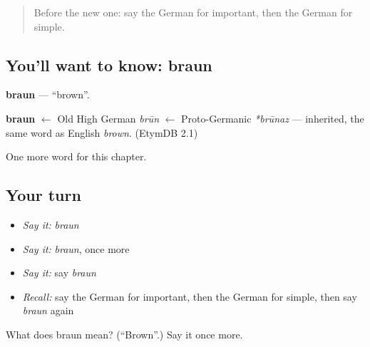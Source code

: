\begin{quote}
Before the new one: say the German for important, then the German for simple.
\end{quote}

\subsection*{You'll want to know: braun}
\textbf{braun} — \textquotedblleft{}brown\textquotedblright{}.

\begin{cousinweb}
\textbf{braun} $\leftarrow$ Old High German \emph{brūn} $\leftarrow$ Proto-Germanic \emph{*brūnaz} — inherited, the same word as English \emph{brown}. (EtymDB 2.1)
\end{cousinweb}

\begin{grammarlens}[title={What you've built}]
One more word for this chapter.
\end{grammarlens}

\subsection*{Your turn}
\begin{itemize}
\raggedright
  \item \emph{Say it:} \emph{braun}
  \item \emph{Say it:} \emph{braun}, once more
  \item \emph{Say it:} say \emph{braun}
  \item \emph{Recall:} say the German for important, then the German for simple, then say \emph{braun} again
\end{itemize}

\begin{tcolorbox}[breakable,colback=teal!4,colframe=teal!35!black,title={Before you move on}]
What does braun mean? (\textquotedblleft{}Brown\textquotedblright{}.) Say it once more.
\end{tcolorbox}
